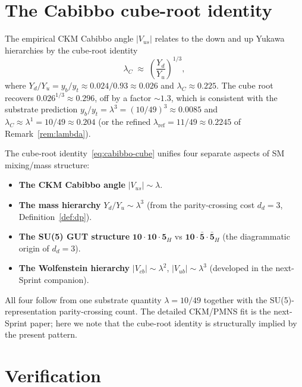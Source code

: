 \documentclass[11pt,reqno]{amsart}
\theoremstyle{plain}
\theoremstyle{definition}
\theoremstyle{remark}
\newcommand{\rep}[1]{\mathbf{#1}}
\newcommand{\barrep}[1]{\bar{\mathbf{#1}}}
\begin{document}
\section{The Cabibbo cube-root identity}\label{sec:cabibbo}

The empirical CKM Cabibbo angle $|V_{us}|$ relates to the down
and up Yukawa hierarchies by the cube-root identity
\begin{equation}
  \lambda_{C} \;\approx\; \left(\frac{Y_{d}}{Y_{u}}\right)^{1/3},\label{eq:cabibbo-cube}
\end{equation}
where $Y_{d}/Y_{u} = y_{b}/y_{t} \approx 0.024/0.93 \approx
0.026$ and $\lambda_{C} \approx 0.225$. The cube root recovers
$0.026^{1/3} \approx 0.296$, off by a factor $\sim 1.3$, which
is consistent with the substrate prediction
$y_{b}/y_{t} = \lambda^{3} = (10/49)^{3} \approx 0.0085$ and
$\lambda_{C} \approx \lambda^{1} = 10/49 \approx 0.204$ (or the
refined $\lambda_{\mathrm{ref}} = 11/49 \approx 0.2245$ of
Remark~\ref{rem:lambda}).

The cube-root identity~\eqref{eq:cabibbo-cube} unifies four
separate aspects of SM mixing/mass structure:

\begin{itemize}\setlength\itemsep{0pt}
\item \textbf{The CKM Cabibbo angle} $|V_{us}| \sim \lambda$.
\item \textbf{The mass hierarchy} $Y_{d}/Y_{u} \sim \lambda^{3}$
(from the parity-crossing cost $d_{d} = 3$,
Definition~\ref{def:dp}).
\item \textbf{The SU(5) GUT structure}
$\rep{10} \cdot \rep{10} \cdot \rep{5}_{H}$ vs $\rep{10} \cdot
\barrep{5} \cdot \barrep{5}_{H}$ (the diagrammatic origin of
$d_{d} = 3$).
\item \textbf{The Wolfenstein hierarchy} $|V_{cb}| \sim
\lambda^{2}$, $|V_{ub}| \sim \lambda^{3}$ (developed in the
next-Sprint companion).
\end{itemize}

All four follow from one substrate quantity $\lambda = 10/49$
together with the SU(5)-representation parity-crossing count.
The detailed CKM/PMNS fit is the next-Sprint paper; here we
note that the cube-root identity is structurally implied by
the present pattern.

\section{Verification}\label{sec:verify}
\end{document}
